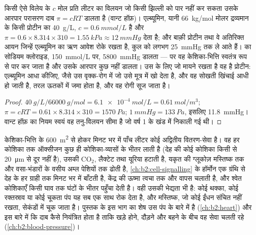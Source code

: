 \begin{theorem}[परासरणी दाब]\label{thm:b2:blood-circulation:oncotic}
किसी ऐसे विलेय के $c$ मोल प्रति लीटर का विलयन जो किसी झिल्ली को पार
नहीं कर सकता उसके आरपार परासरण दाब $\pi = cRT$ डालता है (वान्ट
हॉफ़)।  एल्ब्यूमिन, यानी \qty{66}{kg/mol} मोलर द्रव्यमान के किसी
प्रोटीन का \qty{40}{g/L}, $c = \qty{0.6}{mmol/L}$ है और $\pi =
0.6\times 8.314\times 310 = \qty{1.55}{kPa} \approx \qty{12}{mmHg}$ देता है;
और बाक़ी प्रोटीन तथा वे अतिरिक्त आयन जिन्हें एल्ब्यूमिन का ऋण
आवेश रोके रखता है, कुल को लगभग \qty{25}{mmHg} तक ले आते हैं।
 का सोडियम क्लोराइड, \qty{150}{mmol/L} पर,
\qty{5800}{mmHg} डालता --- पर वह केशिका-भित्ति स्वतंत्र रूप से पार कर
जाता है और उसके आरपार कुछ नहीं डालता। उस  के लिए जो मायने रखता है वह है
प्रोटीन: एल्ब्यूमिन आधा कीजिए, जैसे उस वृक्क-रोग में जो उसे
मूत्र में खो देता है, और वह सोखती खिंचाई आधी हो जाती है, तरल
ऊतकों में जमा होता है, और वह रोगी सूज जाता है।
\end{theorem}
\begin{proof}
$\qty{40}{g/L}/\qty{66000}{g/mol} = \qty{6.1e-4}{mol/L} =
\qty{0.61}{mol/m^3}$; $\pi = cRT = 0.61\times 8.314\times 310 =
\qty{1570}{Pa}$; $\qty{1}{mmHg} = \qty{133}{Pa}$, इसलिए \qty{11.8}{mmHg}।
वान्ट हॉफ़ का नियम स्वयं वह तनु-विलयन सीमा है जो
वर्ष 1 के खंड में निकाली गई थी।
\end{proof}

\begin{example}\label{ex:b2:blood-circulation:transport}
केशिका-भित्ति के \qty{600}{m^2} से होकर मिनट भर में पाँच लीटर कोई
अद्वितीय वितरण-सेवा है। वह हर कोशिका तक ऑक्सीजन
कुछ ही कोशिका-व्यासों के भीतर लाती है (देह की कोई कोशिका किसी 
से \qty{20}{\micro m} से दूर नहीं है), उसकी $\mathrm{CO_2}$,
लैक्टेट तथा यूरिया हटाती है, यकृत की ग्लूकोज़ मस्तिष्क तक और
वसा-भंडारों के वसीय अम्ल पेशियों तक ढोती है,
\cref{ch:b2:cell-signalling} के हॉर्मोन एक ग्रंथि से देह के हर
ग्राही तक मिनट भर में बाँटती है, केंद्र की ऊष्मा
त्वचा तक और वापस चलाती है, और श्वेत कोशिकाएँ किसी घाव तक घंटों के भीतर
पहुँचा देती है। वही उसकी भेद्यता भी है: कोई थक्का, कोई रक्तस्राव या कोई
चूकता पंप यह सब एक साथ रोक देता है, और मस्तिष्क, जो कोई ईंधन
संचित नहीं रखता, सेकंडों में चूक जाता है। पुस्तक के इस भाग का शेष उस
पंप के बारे में है (\cref{ch:b2:heart}) और इस बारे में कि दाब कैसे
नियंत्रित होता है ताकि खड़े होने, दौड़ने और  बहने के बीच वह सेवा
चलती रहे (\cref{ch:b2:blood-pressure})।
\end{example}

